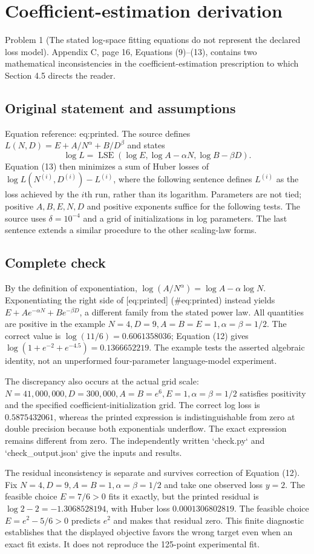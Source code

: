 \documentclass[10pt]{article}
\begin{document}
\section*{Coefficient-estimation derivation}
Problem 1 (The stated log-space fitting equations do not represent the declared loss model).  Appendix C, page 16, Equations (9)–(13), contains two mathematical inconsistencies in the coefficient-estimation prescription to which Section 4.5 directs the reader.\par
\subsection*{Original statement and assumptions}
Equation reference: eq:printed. The source defines \(L(N,D)=E+A/N^\alpha+B/D^\beta\) and states \[\log L=\operatorname{LSE}(\log E,\log A-\alpha N,\log B-\beta D).\] Equation (13) then minimizes a sum of Huber losses of \(\log L(N^{(i)},D^{(i)})-L^{(i)}\), where the following sentence defines \(L^{(i)}\) as the loss achieved by the \(i\)th run, rather than its logarithm. Parameters are not tied; positive \(A,B,E,N,D\) and positive exponents suffice for the following tests. The source uses \(\delta=10^{-4}\) and a grid of initializations in log parameters. The last sentence extends a similar procedure to the other scaling-law forms.\par
\subsection*{Complete check}
By the definition of exponentiation, \(\log(A/N^\alpha)=\log A-\alpha\log N\). Exponentiating the right side of [eq:printed] (\#eq:printed) instead yields \(E+Ae^{-\alpha N}+Be^{-\beta D}\), a different family from the stated power law. All quantities are positive in the example \(N=4,D=9,A=B=E=1,\alpha=\beta=1/2\). The correct value is \(\log(11/6)=0.6061358036\); Equation (12) gives \(\log(1+e^{-2}+e^{-4.5})=0.1366652219\). The example tests the asserted algebraic identity, not an unperformed four-parameter language-model experiment.\par
The discrepancy also occurs at the actual grid scale: \(N=41{,}000{,}000,D=300{,}000,A=B=e^6,E=1,\alpha=\beta=1/2\) satisfies positivity and the specified coefficient-initialization grid. The correct log loss is \(0.5875432061\), whereas the printed expression is indistinguishable from zero at double precision because both exponentials underflow. The exact expression remains different from zero. The independently written `check.py` and `check\_output.json` give the inputs and results.\par
The residual inconsistency is separate and survives correction of Equation (12). Fix \(N=4,D=9,A=B=1,\alpha=\beta=1/2\) and take one observed loss \(y=2\). The feasible choice \(E=7/6>0\) fits it exactly, but the printed residual is \(\log2-2=-1.3068528194\), with Huber loss \(0.0001306802819\). The feasible choice \(E=e^2-5/6>0\) predicts \(e^2\) and makes that residual zero. This finite diagnostic establishes that the displayed objective favors the wrong target even when an exact fit exists. It does not reproduce the 125-point experimental fit.\par
\end{document}
